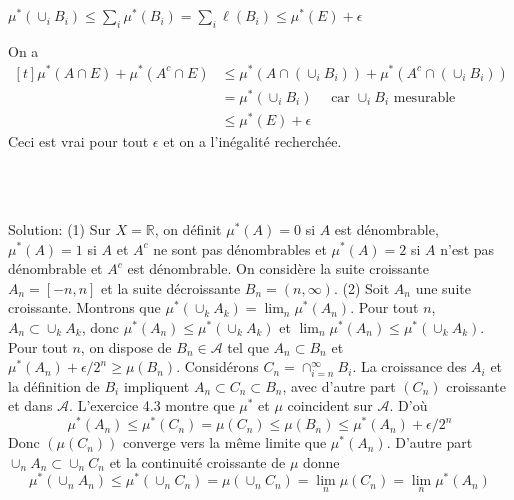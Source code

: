 \documentclass{report}
\begin{document}
\centerline{$\mu^*(\cup_i B_i)\leq \sum_i \mu^*(B_i) = \sum_i \ell (B_i) \leq \mu^*(E)+\epsilon$ } \newline
On a $$\begin{aligned}[t]\mu^*(A\cap E) + \mu^*(A^c\cap E) &\leq \mu^*(A\cap (\cup_i B_i)) + \mu^*(A^c\cap (\cup_i B_i)) \\
&= \mu^*(\cup_i B_i) \quad \text{ car $\cup_i B_i$ mesurable} \\
&\leq \mu^*(E)+\epsilon\end{aligned}
$$
Ceci est vrai pour tout $\epsilon$ et on a l'inégalité recherchée.
\newpage 

\subsection{}  \\ \\

Solution: (1) Sur $X = \mathbb R$, on définit $\mu^*(A) = 0$ si $A$ est dénombrable, $\mu^*(A) = 1$ si $A$ et $A^c$ ne sont pas dénombrables et $\mu^*(A) = 2$ si $A$ n'est pas dénombrable et $A^c$ est dénombrable. \newline 
On considère la suite croissante $A_n=[-n,n]$ et la suite décroissante $B_n = (n,\infty)$. \newline
(2) Soit $A_n$ une suite croissante. Montrons que $\mu^*(\cup_k A_k) = \lim_n \mu^*(A_n)$. \newline
\fbox{$\geq$} Pour tout $n$, $A_n\subset \cup_k A_k$, donc $\mu^*(A_n) \leq \mu^*(\cup_k A_k)$ et  $\lim_n\mu^*(A_n) \leq \mu^*(\cup_k A_k)$.\newline
\fbox{$\leq$} Pour tout $n$, on dispose de $B_n\in \mathcal A$ tel que $A_n\subset B_n$ et  $\mu^*(A_n)+\epsilon/2^n \geq \mu(B_n)$. Considérons $C_n = \cap_{i=n}^\infty B_i$. La croissance des $A_i$ et la définition de $B_i$ impliquent $A_n\subset C_n \subset B_n$, avec d'autre part $(C_n)$ croissante et dans $\mathcal A$.\newline
L'exercice 4.3 montre que $\mu^*$ et $\mu$ coincident sur $\mathcal A$. D'où $$\mu^*(A_n) \leq \mu^*(C_n) = \mu(C_n) \leq \mu(B_n) \leq \mu^*(A_n)+\epsilon/2^n$$
Donc $(\mu(C_n))$ converge vers la même limite que $\mu^*(A_n)$. \newline
D'autre part $\cup_n A_n\subset \cup_n C_n$ et la continuité croissante de $\mu$ donne 
$$\mu^*(\cup_n A_n)\leq \mu^*(\cup_n C_n)=\mu(\cup_n C_n) = \lim_n \mu(C_n) = \lim_n \mu^*(A_n)$$
\end{document}
